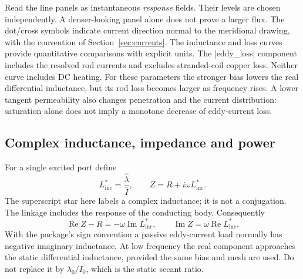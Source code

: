 
\begin{codeexample}[width=0pt]
\end{codeexample}


Read the line panels as instantaneous \emph{response} fields.
Their levels are chosen independently. A denser-looking panel alone does not
prove a larger flux. The dot/cross symbols indicate current direction normal
to the meridional drawing, with the convention of Section~\ref{sec:currents}.
The inductance and loss curves provide quantitative comparisons with explicit
units. The |eddy_loss| component includes the resolved rod currents and excludes
stranded-coil copper loss. Neither curve includes DC heating.
For these parameters the stronger bias lowers the real differential inductance,
but its rod loss becomes larger as frequency rises. A lower tangent permeability
also changes penetration and the current distribution: saturation alone does
not imply a monotone decrease of eddy-current loss.

\subsection{Complex inductance, impedance and power}
For a single excited port define
\[
 L_{\mathrm{inc}}^*=\frac{\widehat\lambda}{\widehat I},\qquad
 Z=R+i\omega L_{\mathrm{inc}}^*.
\]
The superscript star here labels a complex inductance; it is not a conjugation.
The linkage includes the response of the conducting body. Consequently
\[
 \operatorname{Re}Z-R=-\omega\operatorname{Im}L_{\mathrm{inc}}^*,
 \qquad \operatorname{Im}Z=\omega\operatorname{Re}L_{\mathrm{inc}}^*.
\]
With the package's sign convention a passive eddy-current load normally has
negative imaginary inductance. At low frequency the real component approaches
the static differential inductance, provided the same bias and mesh are used.
Do not replace it by $\lambda_0/I_0$, which is the static secant ratio.


